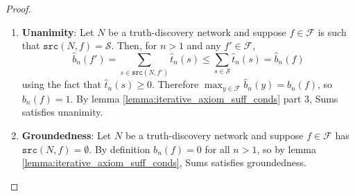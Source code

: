 \documentclass{article}
\theoremstyle{definition} \newtheorem{definition}{Definition}
\theoremstyle{definition} \newtheorem{example}{Example}
\theoremstyle{plain} \newtheorem{axiom}{Axiom}
\theoremstyle{plain} \newtheorem*{remark}{Remark}
\theoremstyle{remark} \newtheorem*{notation}{Notation}
\theoremstyle{plain} \newtheorem{lemma}{Lemma}
\theoremstyle{plain} \newtheorem{theorem}{Theorem}
\theoremstyle{plain} \newtheorem{proposition}{Proposition}
\renewcommand{\S}{\mathcal{S}}  %
\newcommand{\F}{\mathcal{F}}
\newcommand{\src}{\texttt{src}}
\begin{document}
\begin{proof}
\begin{enumerate}
\item\textbf{Unanimity}: Let $N$ be a truth-discovery network and suppose $f \in \F$
is such that $\src(N, f) = \S$. Then, for $n > 1$ and any $f' \in \F$,
\[
    \hat{b}_n(f') = \sum_{s \in \src(N, f')}{\hat{t}_n(s)}
                  \le \sum_{s \in \S}{\hat{t}_n(s)}
                  = \hat{b}_n(f)
\]
using the fact that $\hat{t}_n(s) \ge 0$. Therefore $\max_{y \in
\F}{\hat{b}_n(y)} = \hat{b}_n(f)$, so $b_n(f) = 1$. By lemma
\ref{lemma:iterative_axiom_suff_conds} part 3, Sums satisfies unanimity.

\item\textbf{Groundedness}: Let $N$ be a truth-discovery network and suppose $f
\in \F$ has $\src(N, f) = \emptyset$. By definition $b_n(f) = 0$ for all $n >
1$, so by lemma \ref{lemma:iterative_axiom_suff_conds}, Sums satisfies
groundedness.


\end{enumerate}
\end{proof}
\end{document}
